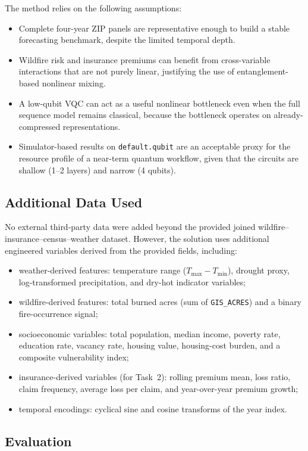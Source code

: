 \documentclass[11pt]{article}
\begin{document}
The method relies on the following assumptions:
\begin{itemize}
  \item Complete four-year ZIP panels are representative enough to build a stable forecasting benchmark, despite the limited temporal depth.
  \item Wildfire risk and insurance premiums can benefit from cross-variable interactions that are not purely linear, justifying the use of entanglement-based nonlinear mixing.
  \item A low-qubit VQC can act as a useful nonlinear bottleneck even when the full sequence model remains classical, because the bottleneck operates on already-compressed representations.
  \item Simulator-based results on \texttt{default.qubit} are an acceptable proxy for the resource profile of a near-term quantum workflow, given that the circuits are shallow (1--2 layers) and narrow (4 qubits).
\end{itemize}

\subsection{Additional Data Used}

No external third-party data were added beyond the provided joined wildfire--insurance--census--weather dataset. However, the solution uses additional engineered variables derived from the provided fields, including:
\begin{itemize}
  \item weather-derived features: temperature range ($T_\text{max} - T_\text{min}$), drought proxy, log-transformed precipitation, and dry-hot indicator variables;
  \item wildfire-derived features: total burned acres (sum of \texttt{GIS\_ACRES}) and a binary fire-occurrence signal;
  \item socioeconomic variables: total population, median income, poverty rate, education rate, vacancy rate, housing value, housing-cost burden, and a composite vulnerability index;
  \item insurance-derived variables (for Task~2): rolling premium mean, loss ratio, claim frequency, average loss per claim, and year-over-year premium growth;
  \item temporal encodings: cyclical sine and cosine transforms of the year index.
\end{itemize}

\subsection{Evaluation}
\end{document}
